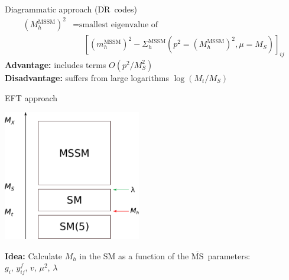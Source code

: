 \documentclass[hyperref={pdfpagelabels=false},ngerman]{beamer}
\renewcommand{\emph}{\textbf}
\newcommand{\DRbar}{\ensuremath{\overline{\text{DR}}}}
\newcommand{\MSbar}{\ensuremath{\overline{\text{MS}}}}
\begin{document}
\begin{frame}{Diagrammatic approach (\DRbar\ codes)}
  \begin{align*}
    (M_h^\text{MSSM})^2 &= \text{smallest eigenvalue of} \\
    &\phantom{={}} \left[(m_h^\text{MSSM})^2 - \Sigma^\text{MSSM}_h(p^2 = (M_h^\text{MSSM})^2,\mu = M_S)\right]_{ij}
  \end{align*}
  \emph{Advantage:} includes terms $O(p^2/M_S^2)$\\
  \emph{Disadvantage:} suffers from large logarithms $\log(M_t/M_S)$\\
\end{frame}


\begin{frame}{EFT approach}
  \begin{center}
    \includegraphics[width=0.45\textwidth]{images/mssm-sm-tower-eft}\\[1em]
  \end{center}
  \emph{Idea:} Calculate $M_h$ in the SM as a function of the \MSbar\ parameters:\\[1em]
  \centering $g_i$, $y^f_{ij}$, $v$, $\mu^2$, $\lambda$
\end{frame}
\end{document}
